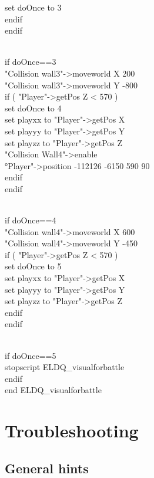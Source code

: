 \documentclass[
]{article}
\begin{document}
set doOnce to 3\\
endif\\
endif\\
\strut \\
if doOnce==3\\
"Collision wall3"-\textgreater moveworld X 200\\
"Collision wall3"-\textgreater moveworld Y -800\\
if ( "Player"-\textgreater getPos Z \textless{} 570 )\\
set doOnce to 4\\
set playxx to "Player"-\textgreater getPos X\\
set playyy to "Player"-\textgreater getPos Y\\
set playzz to "Player"-\textgreater getPos Z\\
"Collision Wall4"-\textgreater enable\\
°Player"-\textgreater position -112126 -6150 590 90\\
endif\\
endif\\
\strut \\
if doOnce==4\\
"Collision wall4"-\textgreater moveworld X 600\\
"Collision wall4"-\textgreater moveworld Y -450\\
if ( "Player"-\textgreater getPos Z \textless{} 570 )\\
set doOnce to 5\\
set playxx to "Player"-\textgreater getPos X\\
set playyy to "Player"-\textgreater getPos Y\\
set playzz to "Player"-\textgreater getPos Z\\
endif\\
endif\\
\strut \\
if doOnce==5\\
stopscript ELDQ\_visualforbattle\\
endif\\
end ELDQ\_visualforbattle

\hypertarget{troubleshooting}{%
\section{Troubleshooting}\label{troubleshooting}}

\hypertarget{general-hints}{%
\subsection{General hints}\label{general-hints}}
\end{document}
